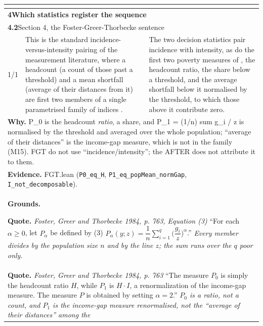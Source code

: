 \documentclass[10pt]{article}
\theoremstyle{definition}
\newlength{\fullw}\setlength{\fullw}{25.9cm}
\newcommand{\entryhead}[2]{\multicolumn{3}{|l|}{\rule{0pt}{2.6ex}\large\textbf{#1}\quad #2} \\ \hline}
\begin{document}
{\begin{longtable}{|p{0.9cm}|p{12.2cm}|p{12.2cm}|}
\multicolumn{3}{|l|}{} \\ \hline
\multicolumn{3}{|l|}{\rule{0pt}{3.2ex}\Large\textbf{4\quad Which statistics register the sequence}} \\ \hline\hline
\entryhead{4.2}{Section 4, the Foster-Greer-Thorbecke sentence\quad{\footnotesize\textit{(formerly C.13)}}}
1/1 & This is the standard incidence-versus-intensity pairing of the measurement literature, where a headcount (a count of those past a threshold) and a mean shortfall (average of their distances from it) are first two members of a single parametrised family of indices \citep{FosterGreerThorbecke1984}. & The two decision statistics pair incidence with intensity, as do the first two poverty measures of \citet{FosterGreerThorbecke1984}, the headcount ratio, the share below a threshold, and the average shortfall below it normalised by the threshold, to which those above it contribute zero. \\ \hline
\multicolumn{3}{|p{\fullw}|}{\textbf{Why.} P\_0 is the headcount \emph{ratio}, a share, and P\_1 = (1/n) sum g\_i / z is normalised by the threshold and averaged over the whole population; ``average of their distances'' is the income-gap measure, which is not in the family (M15). FGT do not use ``incidence/intensity''; the AFTER does not attribute it to them.} \\
\multicolumn{3}{|p{\fullw}|}{\textbf{Evidence.} FGT.lean (\texttt{P0\_eq\_H}, \texttt{P1\_eq\_popMean\_normGap}, \texttt{I\_not\_decomposable}).} \\ \hline
\multicolumn{3}{|p{\fullw}|}{\textbf{Grounds.}\par \textbf{Quote.} \textit{Foster, Greer and Thorbecke 1984, p. 763, Equation (3)} \newline ``For each $\alpha \ge 0$, let $P_\alpha$ be defined by (3)
$P_\alpha(y; z) = \dfrac{1}{n} \sum_{i=1}^{q} \Big(\dfrac{g_i}{z}\Big)^{\alpha}$.'' \newline \textit{Every member divides by the population size $n$ and by the line
$z$; the sum runs over the $q$ poor only.}} \\
\multicolumn{3}{|p{\fullw}|}{\textbf{Quote.} \textit{Foster, Greer and Thorbecke 1984, p. 763} \newline ``The measure $P_0$ is simply the headcount ratio $H$, while
$P_1$ is $H \cdot I$, a renormalization of the income-gap measure. The
measure $P$ is obtained by setting $\alpha = 2$.'' \newline \textit{$P_0$ is a ratio, not a count, and $P_1$ is the income-gap
measure renormalised, not the ``average of their distances'' among the
}}
\end{longtable}}
\end{document}
